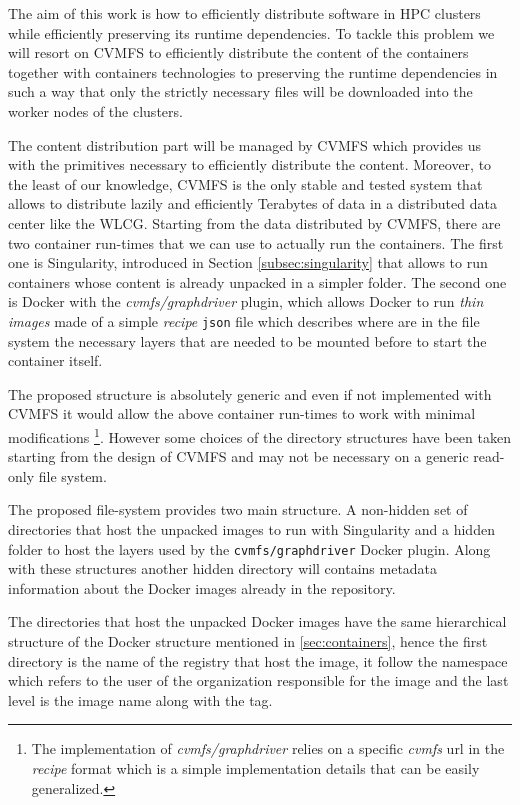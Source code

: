 The aim of this work is how to efficiently distribute software in HPC clusters
while efficiently preserving its runtime dependencies. To tackle this problem
we will resort on CVMFS to efficiently distribute the content of the containers
together with containers technologies to preserving the runtime dependencies in
such a way that only the strictly necessary files will be downloaded into the
worker nodes of the clusters.


The content distribution part will be managed by CVMFS which provides us with
the primitives necessary to efficiently distribute the content. Moreover, to
the least of our knowledge, CVMFS is the only stable and tested system that
allows to distribute lazily and efficiently Terabytes of data in a distributed
data center like the WLCG.  Starting from the data distributed by CVMFS, there
are two container run-times that we can use to actually run the containers.
The first one is Singularity, introduced in Section \ref{subsec:singularity}
that allows to run containers whose content is already unpacked in a simpler
folder. The second one is Docker with the \textit{cvmfs/graphdriver} plugin,
which allows Docker to run \textit{thin images} made of a simple
\textit{recipe} \texttt{json} file which describes where are in the file system
the necessary layers that are needed to be mounted before to start the
container itself.

The proposed structure is absolutely generic and even if not implemented with
CVMFS it would allow the above container run-times to work with minimal
modifications \footnote{The implementation of \textit{cvmfs/graphdriver} relies
on a specific \textit{cvmfs} url in the \textit{recipe} format which is a
simple implementation details that can be easily generalized.}. However some
choices of the directory structures have been taken starting from the design of
CVMFS and may not be necessary on a generic read-only file system.

The proposed file-system provides two main structure. A non-hidden set of
directories that host the unpacked images to run with Singularity and a hidden
folder to host the layers used by the \texttt{cvmfs/graphdriver} Docker plugin.
Along with these structures another hidden directory will contains metadata
information about the Docker images already in the repository.

The directories that host the unpacked Docker images have the same hierarchical
structure of the Docker structure mentioned in \ref{sec:containers}, hence
the first directory is the name of the registry that host the image, it follow
the namespace which refers to the user of the organization responsible for the
image and the last level is the image name along with the tag.

